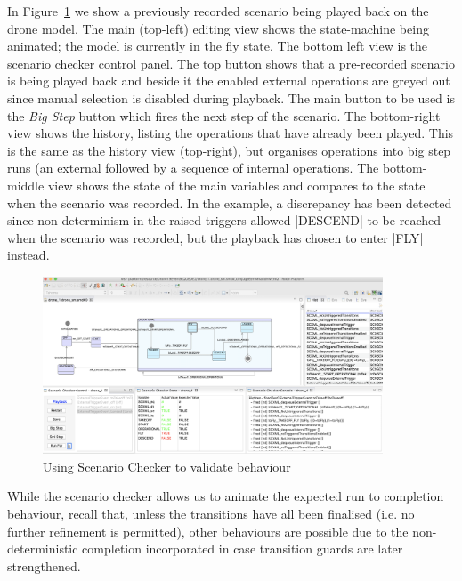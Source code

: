 In Figure~\ref{fig:scenarioChecker} we show a previously recorded scenario being played back on the drone model.
The main (top-left) editing view shows the state-machine being animated; the model is currently in the fly state.
The bottom left view is the scenario checker control panel.
The top button shows that a pre-recorded scenario is being played back and beside it the enabled external operations are greyed out since manual selection is disabled during playback.
The main button to be used is the \emph{Big Step} button which fires the next step of the scenario.
The bottom-right view shows the history, listing the operations that have already been played.
This is the same as the \PROB history view (top-right), but organises operations into big step runs (an external followed by a sequence of internal operations.
The bottom-middle view shows the state of the main variables and compares to the state when the scenario was recorded.
In the example, a discrepancy has been detected since non-determinism in the raised triggers allowed |DESCEND| to be reached when the scenario was recorded, but the playback has chosen to enter |FLY| instead.


\begin{figure}[!h]
	\centering
	\includegraphics[width=0.90\textwidth, trim=30 50 60 0]{figures/scenarioChecker_1.png}
	\caption{Using Scenario Checker to validate behaviour}
	\label{fig:scenarioChecker}
\end{figure}

While the scenario checker allows us to animate the expected run to completion behaviour, recall that, unless the transitions have all been finalised (i.e. no further refinement is permitted),  other behaviours are possible due to the non-deterministic completion incorporated in case transition guards are later strengthened. 
 

